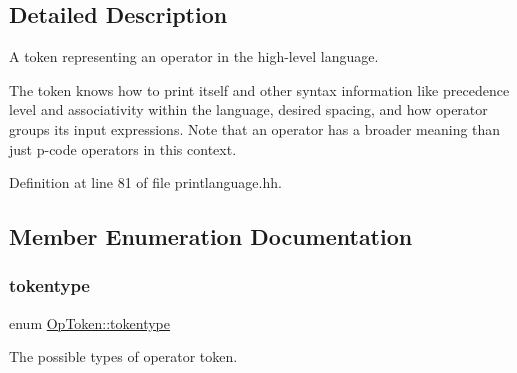 \subsection{Detailed Description}
A token representing an operator in the high-\/level language. 

The token knows how to print itself and other syntax information like precedence level and associativity within the language, desired spacing, and how operator groups its input expressions. Note that an operator has a broader meaning than just p-\/code operators in this context. 

Definition at line 81 of file printlanguage.\+hh.



\subsection{Member Enumeration Documentation}
\mbox{\label{class_op_token_af41c7f108d5662ede7765c5a6c44eaff}} 
\subsubsection{\texorpdfstring{tokentype}{tokentype}}
{\footnotesize\ttfamily enum \mbox{\hyperlink{class_op_token_af41c7f108d5662ede7765c5a6c44eaff}{Op\+Token\+::tokentype}}}



The possible types of operator token. 

